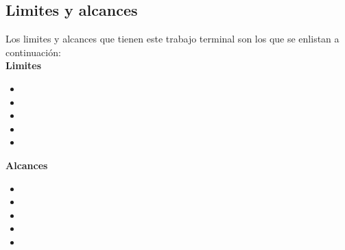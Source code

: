 \documentclass[12pt, a4paper, titlepage]{report}
\begin{document}
    	    \subsection{Limites y alcances}
    	    Los limites y alcances que tienen este trabajo terminal son los que se enlistan a continuación:\\
	
        	\textbf{Limites}
            \begin{itemize}
        	\item \lipsum[1]
        	    \item \lipsum[3]
        	    \item \lipsum[4]
        	    \item \lipsum[5]
        	    \item \lipsum[6]
        	\end{itemize}
        	
        	\textbf{Alcances}
        	\begin{itemize}
        	    \item \lipsum[7]
        	    \item \lipsum[8]
        	    \item \lipsum[9]
        	    \item \lipsum[10]
        	    \item \lipsum[11]
            \end{itemize}
    	
\end{document}
